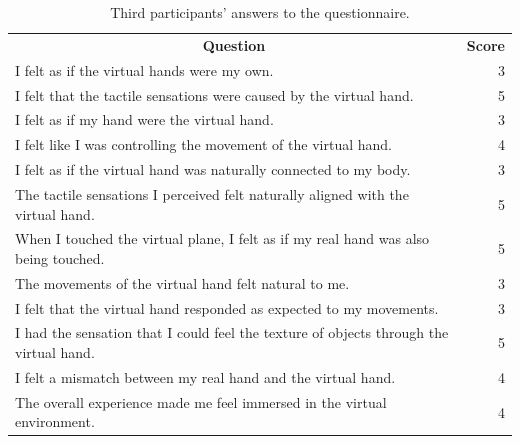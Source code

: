 \documentclass[uplatex,
12pt, %
a4paper,
english, %
oneside,
titlepage,
singlespacing, %
liststotoc, %
headsepline,
]{MastersDoctoralThesis} %
\begin{document}
\begin{appendices}
\begin{table}[H]
  \centering
  \caption{Third participants' answers to the questionnaire.}
    \begin{tabular}{|lrrrrrrrr|r|}
    \toprule
    \multicolumn{9}{c|}{\multirow{2}[2]{*}{\textbf{Question}}}            & \multicolumn{1}{c|}{\multirow{2}[2]{*}{\textbf{Score}}} \\
    \multicolumn{9}{c|}{}                                                 &  \\
    \midrule
    \multicolumn{9}{|l|}{I felt as if the virtual hands were my own.}     & 3 \\
    \midrule
    \multicolumn{9}{|l|}{I felt that the tactile sensations were caused by the virtual hand.} & 5 \\
    \midrule
    \multicolumn{9}{|l|}{I felt as if my hand were the virtual hand.}     & 3 \\
    \midrule
    \multicolumn{9}{|l|}{I felt like I was controlling the movement of the virtual hand.} & 4 \\
    \midrule
    \multicolumn{9}{|l|}{I felt as if the virtual hand was naturally connected to my body.} & 3 \\
    \midrule
    \multicolumn{9}{|l|}{The tactile sensations I perceived felt naturally aligned with the virtual hand.} & 5 \\
    \midrule
    \multicolumn{9}{|l|}{When I touched the virtual plane, I felt as if my real hand was also being touched.} & 5 \\
    \midrule
    \multicolumn{9}{|l|}{The movements of the virtual hand felt natural to me.} & 3 \\
    \midrule
    \multicolumn{9}{|l|}{I felt that the virtual hand responded as expected to my movements.} & 3 \\
    \midrule
    \multicolumn{9}{|l|}{I had the sensation that I could feel the texture of objects through the virtual hand.} & 5 \\
    \midrule
    \multicolumn{9}{|l|}{I felt a mismatch between my real hand and the virtual hand. } & 4 \\
    \midrule
    \multicolumn{9}{|l|}{The overall experience made me feel immersed in the virtual environment.} & 4 \\
    \bottomrule
    \end{tabular}%
  \label{tab:Q_3}%
\end{table}%


\end{appendices}
\end{document}
